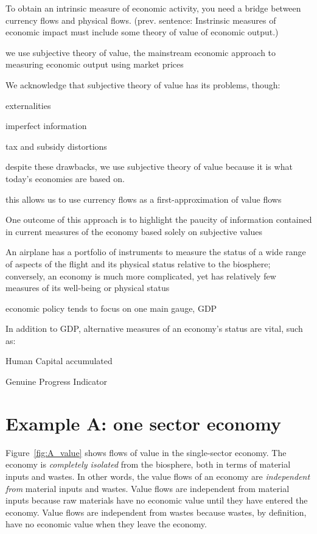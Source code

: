 \begin{outline}[enumerate]
\1 To obtain an intrinsic measure of economic activity, you need a bridge between currency flows and physical flows.  (prev. sentence: Instrinsic measures of economic impact must include some theory of value of economic output.)

	\2 we use subjective theory of value, the mainstream economic approach to measuring economic output using market prices

	\2 We acknowledge that subjective theory of value has its problems, though:

		\3 externalities

		\3 imperfect information

		\3 tax and subsidy distortions

	\2 despite these drawbacks, we use subjective theory of value because it is what today's economies are based on.

	\2 this allows us to use currency flows as a first-approximation of value flows

\1 One outcome of this approach is to highlight the paucity of information contained in current measures of the economy based solely on subjective values

	\2 An airplane has a portfolio of instruments to measure the status of a wide range of aspects of the flight and its physical status relative to the biosphere; conversely, an economy is much more complicated, yet has relatively few measures of its well-being or physical status

	\2 economic policy tends to focus on one main gauge, GDP

	\2 In addition to GDP, alternative measures of an economy's status are vital, such as:

		\3 Human Capital accumulated

		\3 Genuine Progress Indicator

\end{outline}


\section{Example A: one sector economy}

Figure~\ref{fig:A_value} shows flows of value in the single-sector economy.
The economy is \emph{completely isolated} from the biosphere,
both in terms of material inputs and wastes.
In other words, the value flows of an economy are \emph{independent from}
material inputs and wastes.
Value flows are independent from material inputs
because raw materials have no economic value 
until they have entered the economy.
Value flows are independent from wastes
because wastes, by definition, have no economic value 
when they leave the economy.

